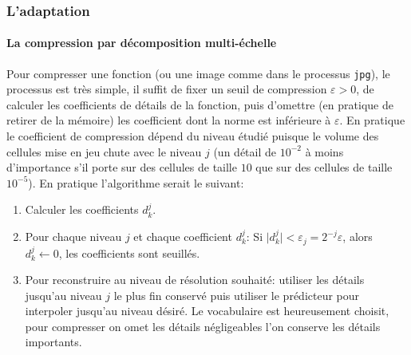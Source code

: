 \subsubsection{L'adaptation}\label{par:adaptation}
    \paragraph{La compression par décomposition multi-échelle}
            Pour compresser une fonction (ou une image comme dans le processus \texttt{jpg}), le processus est très simple, il suffit de fixer un seuil de compression $\varepsilon > 0$,
            de calculer les coefficients de détails de la fonction, 
            puis d'omettre (en pratique de retirer de la mémoire) les coefficient dont la norme est inférieure à $\varepsilon$.
            En pratique le coefficient de compression dépend du niveau étudié puisque le volume des cellules mise en jeu chute avec le niveau $j$
            (un détail de $10^{-2}$ à moins d'importance s'il porte sur des cellules de taille $10$ que sur des cellules de taille $10^{-5}$).
            En pratique l'algorithme serait le suivant:
            \begin{enumerate}  
                \item Calculer les coefficients $d_k^j$.
                \item Pour chaque niveau $j$ et chaque coefficient $d_k^j$: Si $\vert d_k^j \vert < \varepsilon_j = 2^{-j}\varepsilon$, alors $d_k^j\leftarrow 0$, les coefficients sont seuillés.
                \item[] Pour reconstruire au niveau de résolution souhaité: utiliser les détails jusqu'au niveau $j$ le plus fin conservé puis utiliser le prédicteur 
                pour interpoler jusqu'au niveau désiré. Le vocabulaire est heureusement choisit, pour compresser on omet les détails négligeables l'on conserve les détails importants.
            \end{enumerate}
